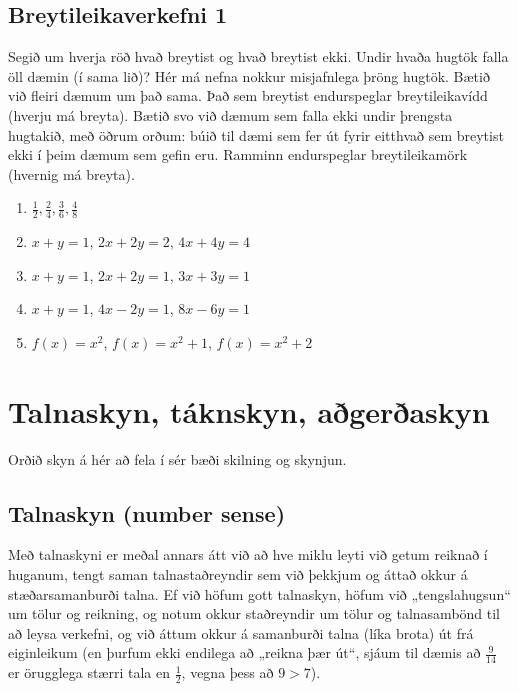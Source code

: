 \documentclass[
  icelandic,
]{book}
\providecommand{\tightlist}{%
  \setlength{\itemsep}{0pt}\setlength{\parskip}{0pt}}
\theoremstyle{definition}
\theoremstyle{definition}
\theoremstyle{definition}
\theoremstyle{definition}
\theoremstyle{remark}
\begin{document}
\section{Breytileikaverkefni 1}\label{verkefni_breytileiki_1}

Segið um hverja röð hvað breytist og hvað breytist ekki. Undir hvaða hugtök falla öll dæmin (í sama lið)? Hér má nefna nokkur misjafnlega þröng hugtök. Bætið við fleiri dæmum um það sama. Það sem breytist endurspeglar breytileikavídd (hverju má breyta). Bætið svo við dæmum sem falla ekki undir þrengsta hugtakið, með öðrum orðum: búið til dæmi sem fer út fyrir eitthvað sem breytist ekki í þeim dæmum sem gefin eru. Ramminn endurspeglar breytileikamörk (hvernig má breyta).

\begin{enumerate}
\def\labelenumi{\arabic{enumi}.}
\tightlist
\item
  \(\frac{1}{2}, \frac{2}{4}, \frac{3}{6}, \frac{4}{8}\)
\item
  \(x+y=1\), \(2x+2y=2\), \(4x+4y=4\)
\item
  \(x+y=1\), \(2x+2y=1\), \(3x+3y=1\)
\item
  \(x+y=1\), \(4x-2y=1\), \(8x-6y=1\)
\item
  \(f(x)=x^2\), \(f(x)=x^2+1\), \(f(x)=x^2+2\)
\end{enumerate}

\chapter{Talnaskyn, táknskyn, aðgerðaskyn}\label{skyn}

Orðið skyn á hér að fela í sér bæði skilning og skynjun.

\section{Talnaskyn (number sense)}\label{talnaskyn}

Með talnaskyni er meðal annars átt við að hve miklu leyti við getum reiknað í huganum, tengt saman talnastaðreyndir sem við þekkjum og áttað okkur á stæðarsamanburði talna. Ef við höfum gott talnaskyn, höfum við „tengslahugsun`` um tölur og reikning, og notum okkur staðreyndir um tölur og talnasambönd til að leysa verkefni, og við áttum okkur á samanburði talna (líka brota) út frá eiginleikum (en þurfum ekki endilega að „reikna þær út``, sjáum til dæmis að \(\frac{9}{14}\) er örugglega stærri tala en \(\frac{1}{2}\), vegna þess að \(9>7\)).
\end{document}
